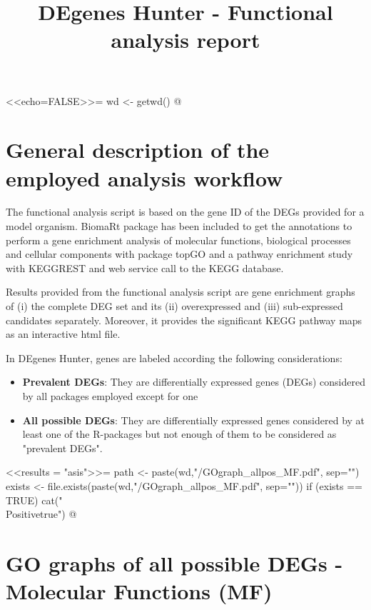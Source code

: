 \documentclass{article}
\begin{document}
<<echo=FALSE>>=
wd <- getwd()
@


\title{DEgenes Hunter - Functional analysis report}
	\maketitle


\section{General description of the employed analysis workflow}


The functional analysis script is based on the gene ID of the DEGs provided for a model organism. BiomaRt package has been included to get the annotations to perform a gene enrichment analysis of molecular functions, biological processes and cellular components with package topGO and a pathway enrichment study with KEGGREST and web service call to the KEGG database. 

Results provided from the functional analysis script are gene enrichment graphs of (i) the complete DEG set and its (ii) overexpressed and (iii) sub-expressed candidates separately. Moreover, it provides the significant KEGG pathway maps as an interactive html file.



In DEgenes Hunter, genes are labeled according the following considerations:
  \begin{itemize}
         \item {\bf Prevalent DEGs}: They are differentially expressed genes (DEGs) considered by all packages employed except for one
         \item {\bf All possible DEGs}: They are differentially expressed genes considered by at least one of the R-packages but not enough of them to be considered as "prevalent DEGs".
  \end{itemize}




\newif\ifPositive

<<results = "asis">>=
path <- paste(wd,"/GOgraph_allpos_MF.pdf", sep="")
exists <- file.exists(paste(wd,"/GOgraph_allpos_MF.pdf", sep=""))
if (exists == TRUE) {
  cat("\\Positivetrue")
}
@

\ifPositive
 \section{GO graphs of all possible DEGs - Molecular Functions (MF)}
\end{document}
